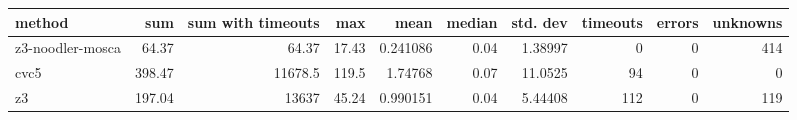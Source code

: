 \begin{tabular}{lrrrrrrrrr}
\hline
 method           &    sum &   sum with timeouts &    max &     mean &   median &   std. dev &   timeouts &   errors &   unknowns \\
\hline
 z3-noodler-mosca &  64.37 &               64.37 &  17.43 & 0.241086 &     0.04 &    1.38997 &          0 &        0 &        414 \\
 cvc5             & 398.47 &            11678.5  & 119.5  & 1.74768  &     0.07 &   11.0525  &         94 &        0 &          0 \\
 z3               & 197.04 &            13637    &  45.24 & 0.990151 &     0.04 &    5.44408 &        112 &        0 &        119 \\
\hline
\end{tabular}
